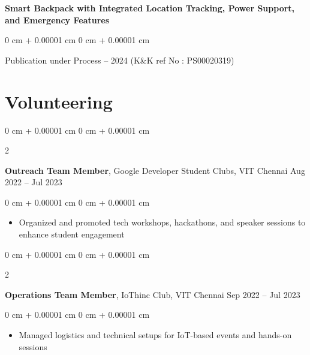 \documentclass[10pt, letterpaper]{article}
\newenvironment{highlights}{
    \begin{itemize}[
        topsep=0.10 cm,
        parsep=0.10 cm,
        partopsep=0pt,
        itemsep=0pt,
        leftmargin=0 cm + 10pt
    ]
}{
    \end{itemize}
} %
\newenvironment{onecolentry}{
    \begin{adjustwidth}{
        0 cm + 0.00001 cm
    }{
        0 cm + 0.00001 cm
    }
}{
    \end{adjustwidth}
} %
\newenvironment{twocolentry}[2][]{
    \onecolentry
    \def\secondColumn{#2}
    \setcolumnwidth{\fill, 4.5 cm}
    \begin{paracol}{2}
}{
    \switchcolumn \raggedleft \secondColumn
    \end{paracol}
    \endonecolentry
} %
\begin{document}
         \vspace{0.3 cm}

         \begin{samepage}
     \textbf{Smart Backpack with Integrated Location Tracking, Power Support, and Emergency Features  }
      \vspace{0.05 cm}
      
      \begin{onecolentry}
               Publication under Process – 2024 (K\&K ref No : PS00020319)  
               
               \vspace{0.05 cm}
        \end{onecolentry}
        \end{samepage}
        
 \section{Volunteering}

    \begin{twocolentry}{
            Aug 2022 – Jul 2023 
        }
            \textbf{Outreach Team Member}, Google Developer Student Clubs, VIT Chennai \end{twocolentry}

        \vspace{0.10 cm}
        \begin{onecolentry}
            \begin{highlights}
                \item Organized and promoted tech workshops, hackathons, and speaker sessions to enhance student engagement 
            \end{highlights}
        \end{onecolentry}

        \vspace{0.2 cm}
        
        \begin{twocolentry}{
            Sep 2022 – Jul 2023 
        }
            \textbf{Operations Team Member}, IoThinc Club, VIT Chennai \end{twocolentry}

        \vspace{0.10 cm}
        \begin{onecolentry}
            \begin{highlights}
                \item Managed logistics and technical setups for IoT-based events and hands-on sessions 
            \end{highlights}
        \end{onecolentry}
         \vspace{0.2 cm}
        
\end{document}
